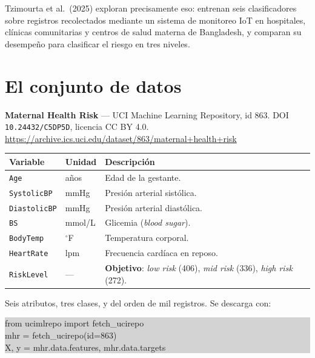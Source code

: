 \documentclass[11pt, a4paper]{article}
\begin{document}
Tzimourta et al.~(2025) exploran precisamente eso: entrenan seis clasificadores sobre registros recolectados mediante un sistema de monitoreo IoT en hospitales, clínicas comunitarias y centros de salud materna de Bangladesh, y comparan su desempe\~no para clasificar el riesgo en tres niveles.

\section{El conjunto de datos}

\noindent\textbf{Maternal Health Risk} --- UCI Machine Learning Repository, id 863.
DOI \texttt{10.24432/C5DP5D}, licencia CC BY 4.0.\\
\url{https://archive.ics.uci.edu/dataset/863/maternal+health+risk}

\vspace{0.6em}
\noindent
\begin{tabularx}{\textwidth}{@{}llX@{}}
\toprule
\textbf{Variable} & \textbf{Unidad} & \textbf{Descripci\'on}\\
\midrule
\texttt{Age}          & a\~nos      & Edad de la gestante.\\
\texttt{SystolicBP}   & mmHg        & Presi\'on arterial sist\'olica.\\
\texttt{DiastolicBP}  & mmHg        & Presi\'on arterial diast\'olica.\\
\texttt{BS}           & mmol/L      & Glicemia (\emph{blood sugar}).\\
\texttt{BodyTemp}     & $^\circ$F   & Temperatura corporal.\\
\texttt{HeartRate}    & lpm         & Frecuencia card\'iaca en reposo.\\
\midrule
\texttt{RiskLevel}    & ---         & \textbf{Objetivo}: \emph{low risk} (406), \emph{mid risk} (336), \emph{high risk} (272).\\
\bottomrule
\end{tabularx}

\vspace{0.6em}
\noindent
Seis atributos, tres clases, y del orden de mil registros. Se descarga con:

\vspace{0.3em}
\noindent\colorbox{LightGray}{\parbox{\dimexpr\textwidth-2\fboxsep}{\ttfamily\small
from ucimlrepo import fetch\_ucirepo\\
mhr = fetch\_ucirepo(id=863)\\
X, y = mhr.data.features, mhr.data.targets
}}
\end{document}
